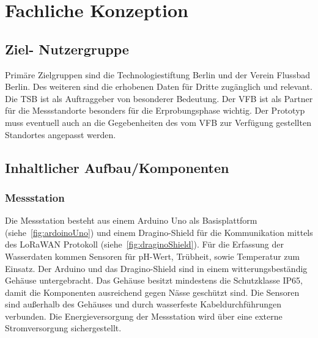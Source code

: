 \section{Fachliche Konzeption}

\subsection{Ziel- Nutzergruppe}

Primäre Zielgruppen sind die Technologiestiftung Berlin und der Verein Flussbad Berlin. Des weiteren sind die erhobenen Daten für Dritte zugänglich und relevant. Die TSB ist als Auftraggeber von besonderer Bedeutung. Der VFB ist als Partner für die Messstandorte besonders für die Erprobungsphase wichtig. Der Prototyp muss eventuell auch an die Gegebenheiten des vom VFB zur Verfügung gestellten Standortes angepasst werden.

\subsection{Inhaltlicher Aufbau/Komponenten}\label{subsec:con_strct_comp}

\subsubsection{Messstation}
Die Messstation besteht aus einem Arduino Uno als Basisplattform (siehe~\autoref{fig:ardoinoUno}) und einem Dragino-Shield für die Kommunikation mittels des LoRaWAN Protokoll (siehe~\autoref{fig:draginoShield}). Für die Erfassung der Wasserdaten kommen Sensoren für pH-Wert, Trübheit, sowie Temperatur zum Einsatz.\newline
Der Arduino und das Dragino-Shield sind in einem witterungsbest\"andig Gehäuse untergebracht. Das Gehäuse besitzt mindestens die Schutzklasse IP65, damit die Komponenten ausreichend gegen Nässe geschützt sind. Die Sensoren sind außerhalb des Gehäuses und durch wasserfeste Kabeldurchführungen verbunden. Die Energieversorgung der Messstation wird über eine externe Stromversorgung sichergestellt.

